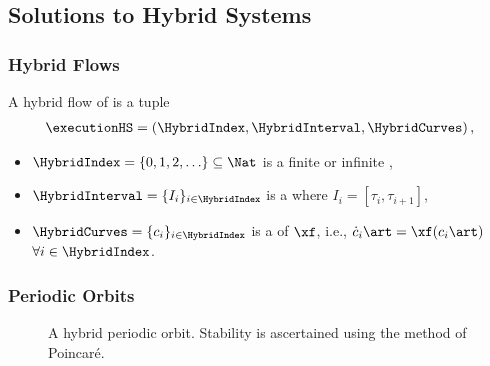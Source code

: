 \subsection{Solutions to Hybrid Systems}
\begin{frame}[t]
  \frametitle{Hybrid Flows}
  A \alert{hybrid flow} of \HS is a tuple
  \begin{align*}
    \executionHS = \left( \HybridIndex, \HybridInterval, \HybridCurves \right),
  \end{align*}
  \vspace{-2em}
  \begin{itemize}
  \item $\HybridIndex = \{0, 1, 2, \ldots\} \subseteq \Nat$ is a finite or infinite ,
  \item $\HybridInterval = \{I_{i} \}_{i \in \HybridIndex}$ is a  where $I_{i} = [\tau_{i}, \tau_{i + 1}]$,
  \item $\HybridCurves = \{c_{i} \}_{i \in \HybridIndex}$ is a  of $\xf$, i.e., ${\dot c}_{i}\art = \xf(c_{i}\art)$ $\forall i \in \HybridIndex$.
  \end{itemize}


\end{frame}


\begin{frame}[t]
  \frametitle{Periodic Orbits}
  \begin{figure}    
    \centering
    \def\svgwidth{.45\columnwidth}
    
    \caption{A hybrid periodic orbit. Stability is ascertained using the method of Poincar\'e.}
  \end{figure}
\end{frame}

